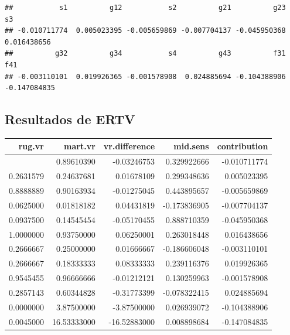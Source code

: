 \documentclass[
]{book}
\newenvironment{Shaded}{\begin{snugshade}}{\end{snugshade}}
\newcommand{\AttributeTok}[1]{\textcolor[rgb]{0.13,0.29,0.53}{#1}}
\newcommand{\FunctionTok}[1]{\textcolor[rgb]{0.13,0.29,0.53}{\textbf{#1}}}
\newcommand{\NormalTok}[1]{#1}
\newcommand{\OtherTok}[1]{\textcolor[rgb]{0.56,0.35,0.01}{#1}}
\newcommand{\SpecialCharTok}[1]{\textcolor[rgb]{0.81,0.36,0.00}{\textbf{#1}}}
\theoremstyle{definition}
\theoremstyle{definition}
\theoremstyle{definition}
\theoremstyle{definition}
\theoremstyle{remark}
\begin{document}
\begin{verbatim}
##           s1          g12           s2          g21          g23           s3 
## -0.010711774  0.005023395 -0.005659869 -0.007704137 -0.045950368  0.016438656 
##          g32          g34           s4          g43          f31          f41 
## -0.003110101  0.019926365 -0.001578908  0.024885694 -0.104388906 -0.147084835
\end{verbatim}

\subsection{Resultados de ERTV}\label{resultados-de-ertv}

\begin{Shaded}
\end{Shaded}

\begin{longtable}{rrrrr}
\toprule
rug.vr & mart.vr & vr.difference & mid.sens & contribution \\ 
\midrule\addlinespace[2.5pt]
0.8636364 & 0.89610390 & -0.03246753 & 0.329922666 & -0.010711774 \\ 
0.2631579 & 0.24637681 & 0.01678109 & 0.299348636 & 0.005023395 \\ 
0.8888889 & 0.90163934 & -0.01275045 & 0.443895657 & -0.005659869 \\ 
0.0625000 & 0.01818182 & 0.04431819 & -0.173836905 & -0.007704137 \\ 
0.0937500 & 0.14545454 & -0.05170455 & 0.888710359 & -0.045950368 \\ 
1.0000000 & 0.93750000 & 0.06250001 & 0.263018448 & 0.016438656 \\ 
0.2666667 & 0.25000000 & 0.01666667 & -0.186606048 & -0.003110101 \\ 
0.2666667 & 0.18333333 & 0.08333333 & 0.239116376 & 0.019926365 \\ 
0.9545455 & 0.96666666 & -0.01212121 & 0.130259963 & -0.001578908 \\ 
0.2857143 & 0.60344828 & -0.31773399 & -0.078322415 & 0.024885694 \\ 
0.0000000 & 3.87500000 & -3.87500000 & 0.026939072 & -0.104388906 \\ 
0.0045000 & 16.53333000 & -16.52883000 & 0.008898684 & -0.147084835 \\ 
\bottomrule
\end{longtable}
\end{document}
